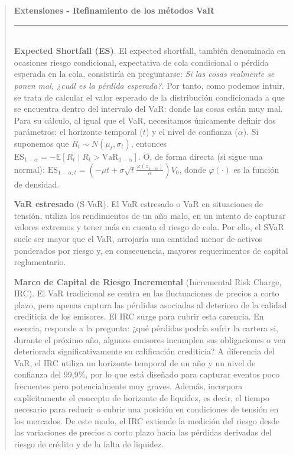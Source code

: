 \documentclass[10pt,a4paper]{article}
\newenvironment{specialblock}[1]{%
      \begin{quote} %
      \small %
      \noindent\textbf{#1}\\[-0.3em] %
      \rule{\linewidth}{0.4pt}\\[0.6em]}{
      \end{quote}}
\begin{document}
\begin{specialblock}{Extensiones - Refinamiento de los métodos VaR}
    \textbf{Expected Shortfall (ES)}. El expected shortfall, también denominada en ocasiones riesgo condicional, expectativa de cola condicional o pérdida esperada en la cola, consistiría en preguntarse: \textit{Si las cosas realmente se ponen mal, ¿cuál es la pérdida esperada?}. Por tanto, como podemos intuir, se trata de calcular el valor esperado de la distribución condicionada a que se encuentra dentro del intervalo del VaR: donde las cosas están muy mal. Para su cálculo, al igual que el VaR, necesitamos únicamente definir dos parámetros: el horizonte temporal ($t$) y el nivel de confianza ($\alpha$). Si suponemos que $R_t\sim N(\mu_t,\sigma_t)$, entonces $\text{ES}_{1-\alpha}=-\mathbb E[R_t \mid R_t > \text{VaR}_{1-\alpha}]$. O, de forma directa (si sigue una normal): $\text{ES}_{1-\alpha,t}=\left(-\mu t+\sigma\sqrt{t}\frac{\varphi(z_{1-\alpha})}{\alpha}\right)V_0$, donde $\varphi(\cdot)$ es la función de densidad.
    
    \textbf{VaR estresado} (S-VaR). El VaR estresado o VaR en situaciones de tensión, utiliza los rendimientos de un año malo, en un intento de capturar valores extremos y tener más en cuenta el riesgo de cola. Por ello, el SVaR suele ser mayor que el VaR, arrojaría una cantidad menor de activos ponderados por riesgo y, en consecuencia, mayores requerimentos de capital reglamentario.
    
    \textbf{Marco de Capital de Riesgo Incremental} (Incremental Risk Charge, IRC). El VaR tradicional se centra en las fluctuaciones de precios a corto plazo, pero apenas captura las pérdidas asociadas al deterioro de la calidad crediticia de los emisores. El IRC surge para cubrir esta carencia. En esencia, responde a la pregunta: ¿qué pérdidas podría sufrir la cartera si, durante el próximo año, algunos emisores incumplen sus obligaciones o ven deteriorada significativamente su calificación crediticia? A diferencia del VaR, el IRC utiliza un horizonte temporal de un año y un nivel de confianza del 99,9\%, por lo que está diseñado para capturar eventos poco frecuentes pero potencialmente muy graves. Además, incorpora explícitamente el concepto de horizonte de liquidez, es decir, el tiempo necesario para reducir o cubrir una posición en condiciones de tensión en los mercados. De este modo, el IRC extiende la medición del riesgo desde las variaciones de precios a corto plazo hacia las pérdidas derivadas del riesgo de crédito y de la falta de liquidez.
    

\end{specialblock}
\end{document}
